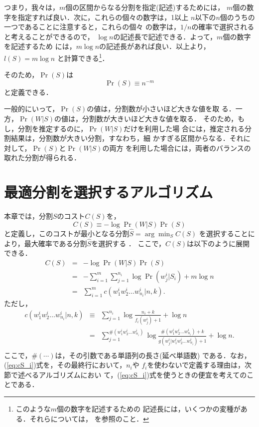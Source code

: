 つまり，我々は，$m$個の区間からなる分割を指定(記述)するためには，
$m$個の数字を指定すれば良い．次に，これらの個々の数字は，1以上
$n$以下の$n$個のうちの一つであることに注意すると，これらの個々
の数字は，$1/n$の確率で選択されると考えることができるので，
$\log n$の記述長で記述できる．よって，$m$個の数字を記述するため
には，$m \log n$の記述長があれば良い．以上より，$l(S) = m \log
n$ と計算できる\footnote{このような$m$個の数字を記述するための
  記述長には，いくつかの変種がある．それらについては，
  \cite{stolcke94:_best_model_mergin_hidden_markov_model_induc}
  を参照のこと．}．

そのため，$\Pr(S)$は
\begin{equation}
  \label{eq:PrM}
  \Pr(S) \equiv n^{-m}
\end{equation}
と定義できる．

一般的にいって，$\Pr(S)$の値は，分割数が小さいほど大きな値を取
る．一方，$\Pr(W|S)$の値は，分割数が大きいほど大きな値を取る．
そのため，もし，分割を推定するのに，$\Pr(W|S)$だけを利用した場
合には，推定される分割結果は，分割数が大きい分割，すなわち，細
かすぎる区間からなる．それに対して，$\Pr(S)$と$\Pr(W|S)$の両方
を利用した場合には，両者のバランスの取れた分割が得られる．

\section{最適分割を選択するアルゴリズム}
\label{sec:algorithm}

本章では，分割$S$のコスト$C(S)$を，
\begin{equation}
  \label{eq:costS}
  C(S) \equiv - \log \Pr(W|S) \Pr(S) 
\end{equation}
と定義し，このコストが最小となる分割$\hat{S}=\arg \min_S C(S)$
を選択することにより，最大確率である分割$\hat{S}$を選択する
．
ここで，$C(S)$は以下のように展開できる．
\begin{eqnarray}
  \label{eq:CS}
  C(S) & = & - \log \Pr(W|S) \Pr(S) \nonumber \\
  & = & - \sum_{i=1}^m \sum_{j=1}^{n_i} \log \Pr(w^i_j|S_i) + m \log n \nonumber \\
  & = & \sum_{i=1}^m c(w^i_1 w^i_2 \ldots w^i_{n_i}|n,k).
\end{eqnarray}
ただし，
\begin{eqnarray}
  \label{eq:cS_i}
  c(w^i_1 w^i_2 \ldots w^i_{n_i}|n,k) & \equiv & \sum_{j=1}^{n_i} \log \frac{n_i+k}{f_i(w^i_j)+1} + \log n \nonumber \\
  & = & \sum_{j=1}^{\#(w^i_1 w^i_2 \ldots w^i_{n_i})} \log \frac{\#(w^i_1 w^i_2 \ldots w^i_{n_i})+k}{g(w^i_j|w^i_1 w^i_2 \ldots w^i_{n_i})+1} + \log n.\nonumber \\
\end{eqnarray}
ここで，$\#(\cdots)$は，その引数である単語列の長さ(延べ単語数)
である．なお，(\ref{eq:cS_i})式を，その最終行において，$n_i$や
$f_i$を使わないで定義する理由は，次節で述べるアルゴリズムにおい
て，(\ref{eq:cS_i})式を使うときの便宜を考えてのことである．

